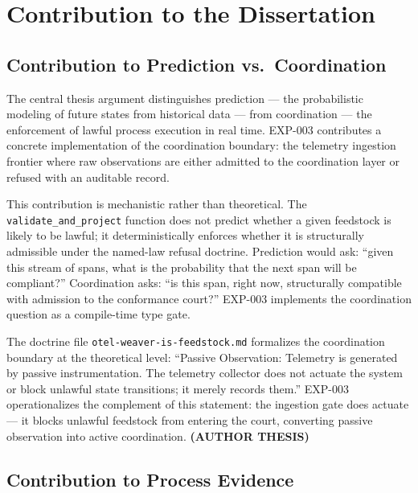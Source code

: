 
\section{Contribution to the Dissertation}
\label{sec:otel-weaver-exp-003-live-check-to-refusal-contribution}

\subsection{Contribution to Prediction vs.~Coordination}
\label{sec:otel-weaver-exp-003-live-check-to-refusal-contribution-prediction}

The central thesis argument distinguishes prediction --- the probabilistic modeling
of future states from historical data --- from coordination --- the enforcement of
lawful process execution in real time. EXP-003 contributes a concrete implementation
of the coordination boundary: the telemetry ingestion frontier where raw observations
are either admitted to the coordination layer or refused with an auditable record.

This contribution is mechanistic rather than theoretical. The \texttt{validate\_and\_project}
function does not predict whether a given feedstock is likely to be lawful; it
deterministically enforces whether it is structurally admissible under the named-law
refusal doctrine. Prediction would ask: ``given this stream of spans, what is the
probability that the next span will be compliant?'' Coordination asks: ``is this
span, right now, structurally compatible with admission to the conformance court?''
EXP-003 implements the coordination question as a compile-time type gate.

The doctrine file \texttt{otel-weaver-is-feedstock.md} formalizes the coordination
boundary at the theoretical level: ``Passive Observation: Telemetry is generated by
passive instrumentation. The telemetry collector does not actuate the system or block
unlawful state transitions; it merely records them.'' EXP-003 operationalizes the
complement of this statement: the ingestion gate does actuate --- it blocks unlawful
feedstock from entering the court, converting passive observation into active
coordination. \textbf{(AUTHOR THESIS)}

\subsection{Contribution to Process Evidence}
\label{sec:otel-weaver-exp-003-live-check-to-refusal-contribution-evidence}

